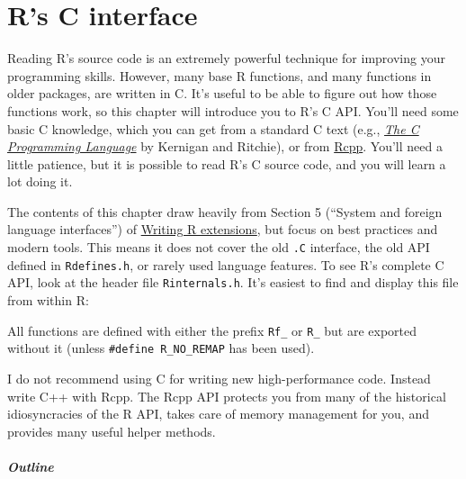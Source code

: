\hypertarget{c-api}{%
\chapter{R's C interface}\label{c-api}}

Reading R's source code is an extremely powerful technique for improving
your programming skills. However, many base R functions, and many
functions in older packages, are written in C. It's useful to be able to
figure out how those functions work, so this chapter will introduce you
to R's C API. You'll need some basic C knowledge, which you can get from
a standard C text (e.g.,
\href{http://amzn.com/0131101633?tag=devtools-20}{\emph{The C
Programming Language}} by Kernigan and Ritchie), or from
\protect\hyperlink{rcpp}{Rcpp}. You'll need a little patience, but it is
possible to read R's C source code, and you will learn a lot doing it.

The contents of this chapter draw heavily from Section 5 (``System and
foreign language interfaces'') of
\href{http://cran.r-project.org/doc/manuals/R-exts.html}{Writing R
extensions}, but focus on best practices and modern tools. This means it
does not cover the old \texttt{.C} interface, the old API defined in
\texttt{Rdefines.h}, or rarely used language features. To see R's
complete C API, look at the header file \texttt{Rinternals.h}. It's
easiest to find and display this file from within R:

\begin{Shaded}
\begin{Highlighting}[]
\StringTok{ }\NormalTok{(}\NormalTok{(}\NormalTok{), }\NormalTok{)}
\end{Highlighting}
\end{Shaded}

All functions are defined with either the prefix \texttt{Rf\_} or
\texttt{R\_} but are exported without it (unless
\texttt{\#define\ R\_NO\_REMAP} has been used).

I do not recommend using C for writing new high-performance code.
Instead write C++ with Rcpp. The Rcpp API protects you from many of the
historical idiosyncracies of the R API, takes care of memory management
for you, and provides many useful helper methods.

\hypertarget{outline}{%
\paragraph{Outline}\label{outline}}

